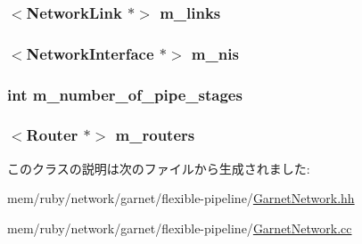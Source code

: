 \label{classGarnetNetwork_ad58a86eb05a281840a92bb3d04adb9b1}
\hypertarget{classGarnetNetwork_a137ed8be2887f373fef072c3f42dd38f}{
\subsubsection[{m\_\-links}]{$<${\bf NetworkLink} $\ast$$>$ {\bf m\_\-links}}}
\label{classGarnetNetwork_a137ed8be2887f373fef072c3f42dd38f}
\hypertarget{classGarnetNetwork_aa0db2f56c97d7327e323d4ac12576479}{
\subsubsection[{m\_\-nis}]{$<${\bf NetworkInterface} $\ast$$>$ {\bf m\_\-nis}}}
\label{classGarnetNetwork_aa0db2f56c97d7327e323d4ac12576479}
\hypertarget{classGarnetNetwork_ad890245efea87e148c209ff848c683a4}{
\subsubsection[{m\_\-number\_\-of\_\-pipe\_\-stages}]{\setlength{\rightskip}{0pt plus 5cm}int {\bf m\_\-number\_\-of\_\-pipe\_\-stages}}}
\label{classGarnetNetwork_ad890245efea87e148c209ff848c683a4}
\hypertarget{classGarnetNetwork_a89e3f8204cf8e9f8dfe5100275b39dcc}{
\subsubsection[{m\_\-routers}]{$<${\bf Router} $\ast$$>$ {\bf m\_\-routers}}}
\label{classGarnetNetwork_a89e3f8204cf8e9f8dfe5100275b39dcc}


このクラスの説明は次のファイルから生成されました:\begin{DoxyCompactItemize}
\item 
mem/ruby/network/garnet/flexible-\/pipeline/\hyperlink{GarnetNetwork_8hh}{GarnetNetwork.hh}\item 
mem/ruby/network/garnet/flexible-\/pipeline/\hyperlink{GarnetNetwork_8cc}{GarnetNetwork.cc}\end{DoxyCompactItemize}
